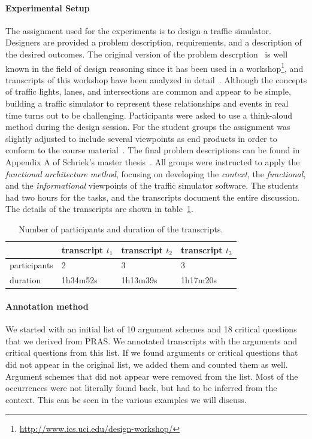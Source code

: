\paragraph{Experimental Setup} The assignment used for the experiments is to design a traffic simulator. Designers are provided a problem description, requirements, and a description of the desired outcomes. The original version of the problem descrption~\cite{UCIworkshop} is well known in the field of design reasoning since it has been used in a workshop\footnote{\url{http://www.ics.uci.edu/design-workshop/}}, and transcripts of this workshop have been analyzed in detail~\cite{Petre:2013:SDA:2535028}. Although the concepts of traffic lights, lanes, and intersections are common and appear to be simple, building a traffic simulator to represent these relationships and events in real time turns out to be challenging. Participants were asked to use a think-aloud method during the design session. For the student groups the assignment was slightly adjusted to include several viewpoints as end products in order to conform to the course material~\cite{Bass:2012:SAP:2392670}. The final problem descriptions can be found in Appendix A of Schriek's master thesis~\cite{masterthesis1}. All groups were instructed to apply the \emph{functional architecture method}, focusing on developing the \emph{context}, the \emph{functional}, and the \emph{informational} viewpoints of the traffic simulator software. The students had two hours for the tasks, and the transcripts document the entire discussion. The details of the transcripts are shown in table~\ref{table:transcripts:info}.

\begin{table}[ht]
\centering
\begin{tabular}{|l|l|l|l|}
\hline
& transcript $t_1$ & transcript $t_2$ & transcript $t_3$\\
\hline
participants & 2 & 3 & 3\\
\hline
duration & 1h34m52s & 1h13m39s & 1h17m20s\\
\hline
\end{tabular}
\caption{Number of participants and duration of the transcripts.}
\label{table:transcripts:info}
\end{table}

\paragraph{Annotation method} 

We started with an initial list of 10 argument schemes and 18 critical questions that we derived from PRAS. We annotated transcripts with the arguments and critical questions from this list. If we found arguments or critical questions that did not appear in the original list, we added them and counted them as well. Argument schemes that did not appear were removed from the list. Most of the occurrences were not literally found back, but had to be inferred from the context. This can be seen in the various examples we will discuss.

